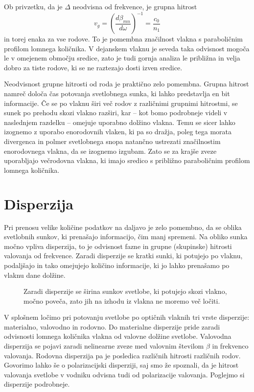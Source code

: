 Ob privzetku, da je $\Delta$ neodvisna od frekvence, je grupna hitrost
\begin{equation}
v_{g}=\left(\frac{d\beta_{mn}}{d\omega}\right)^{-1}=\frac{c_{0}}{n_{1}}
\label{9.21}
\end{equation}
in torej enaka za vse rodove. To je pomembna značilnost vlakna s paraboličnim profilom
lomnega količnika. V dejanskem vlaknu je seveda taka odvisnost mogoča
le v omejenem območju sredice, zato je tudi gornja analiza le približna
in velja dobro za tiste rodove, ki se ne raztezajo dosti izven sredice.

Neodvisnost grupne hitrosti od roda je praktično zelo pomembna. 
Grupna hitrost namreč določa čas potovanja svetlobnega sunka, ki
lahko predstavlja en bit informacije. Če se po vlaknu širi več
rodov z različnimi grupnimi hitrostmi, se sunek po prehodu skozi
vlakno razširi, kar -- kot bomo podrobneje videli v naslednjem razdelku -- omejuje 
uporabno dolžino vlakna. Temu se sicer lahko izognemo z uporabo enorodovnih vlaken,
ki pa so dražja, poleg tega morata divergenca in polmer svetlobnega snopa 
natančno ustrezati značilnostim enorodovnega vlakna, da se izognemo izgubam. 
Zato se za krajše zveze uporabljajo večrodovna vlakna, ki imajo sredico s 
približno paraboličnim profilom lomnega količnika.

\section{Disperzija}
\label{chap:Disperzija}
Pri prenosu velike količine podatkov na daljavo je zelo pomembno, da
se oblika svetlobnih sunkov, ki prenašajo informacijo, čim manj spremeni.
Na obliko sunka močno vpliva disperzija, to je odvisnost fazne in grupne (skupinske) hitrosti
valovanja od frekvence. Zaradi disperzije se kratki sunki, ki potujejo po vlaknu, podaljšajo in 
tako omejujejo količino informacije, ki jo lahko prenašamo po vlaknu dane dolžine.
\begin{figure}[h]
\centering
\def\svgwidth{120truemm} 
 
\caption{Zaradi disperzije se širina sunkov svetlobe, ki potujejo skozi vlakno, 
močno poveča, zato jih na izhodu iz vlakna ne moremo več ločiti.}
\label{fig:disp}
\end{figure}

V splošnem ločimo pri potovanju svetlobe po optičnih vlaknih tri 
vrste disperzije: materialno, valovodno in rodovno. 
Do materialne disperzije pride zaradi odvisnosti lomnega količnika vlakna od 
valovne dolžine svetlobe. Valovodna disperzija se pojavi zaradi nelinearne zveze 
med valovnim številom $\beta$ in frekvenco valovanja. Rodovna
disperzija pa je posledica različnih hitrosti različnih rodov. Govorimo lahko še o 
polarizacijski disperziji, saj smo že spoznali, da je hitrost valovanja svetlobe 
v vodniku odvisna tudi od polarizacije valovanja. Poglejmo si disperzije podrobneje. 

